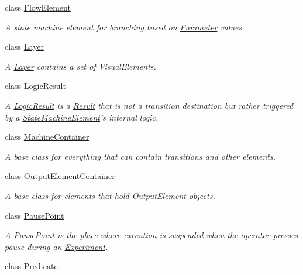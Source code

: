 \begin{DoxyCompactItemize}
class \hyperlink{class_picto_1_1_flow_element}{Flow\-Element}
\begin{DoxyCompactList}\small\item\em A state machine element for branching based on \hyperlink{class_picto_1_1_parameter}{Parameter} values. \end{DoxyCompactList}\item 
class \hyperlink{class_picto_1_1_layer}{Layer}
\begin{DoxyCompactList}\small\item\em A \hyperlink{class_picto_1_1_layer}{Layer} contains a set of Visual\-Elements. \end{DoxyCompactList}\item 
class \hyperlink{class_picto_1_1_logic_result}{Logic\-Result}
\begin{DoxyCompactList}\small\item\em A \hyperlink{class_picto_1_1_logic_result}{Logic\-Result} is a \hyperlink{class_picto_1_1_result}{Result} that is not a transition destination but rather triggered by a \hyperlink{class_picto_1_1_state_machine_element}{State\-Machine\-Element}'s internal logic. \end{DoxyCompactList}\item 
class \hyperlink{class_picto_1_1_machine_container}{Machine\-Container}
\begin{DoxyCompactList}\small\item\em A base class for everything that can contain transitions and other elements. \end{DoxyCompactList}\item 
class \hyperlink{class_picto_1_1_output_element_container}{Output\-Element\-Container}
\begin{DoxyCompactList}\small\item\em A base class for elements that hold \hyperlink{class_picto_1_1_output_element}{Output\-Element} objects. \end{DoxyCompactList}\item 
class \hyperlink{class_picto_1_1_pause_point}{Pause\-Point}
\begin{DoxyCompactList}\small\item\em A \hyperlink{class_picto_1_1_pause_point}{Pause\-Point} is the place where execution is suspended when the operator presses pause during an \hyperlink{class_picto_1_1_experiment}{Experiment}. \end{DoxyCompactList}\item 
class \hyperlink{class_picto_1_1_predicate}{Predicate}

\end{DoxyCompactItemize}
